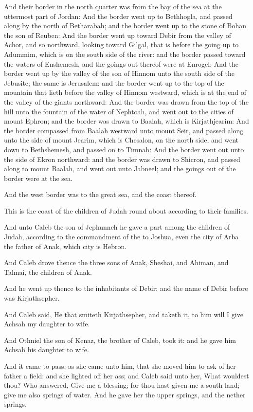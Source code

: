 And their border in the north quarter was from the bay of the sea at the uttermost part of Jordan: \verse And the border went up to Bethhogla, and passed along by the north of Betharabah; and the border went up to the stone of Bohan the son of Reuben: \verse And the border went up toward Debir from the valley of Achor, and so northward, looking toward Gilgal, that is before the going up to Adummim, which is on the south side of the river: and the border passed toward the waters of Enshemesh, and the goings out thereof were at Enrogel: \verse And the border went up by the valley of the son of Hinnom unto the south side of the Jebusite; the same is Jerusalem: and the border went up to the top of the mountain that lieth before the valley of Hinnom westward, which is at the end of the valley of the giants northward: \verse And the border was drawn from the top of the hill unto the fountain of the water of Nephtoah, and went out to the cities of mount Ephron; and the border was drawn to Baalah, which is Kirjathjearim: \verse And the border compassed from Baalah westward unto mount Seir, and passed along unto the side of mount Jearim, which is Chesalon, on the north side, and went down to Bethshemesh, and passed on to Timnah: \verse And the border went out unto the side of Ekron northward: and the border was drawn to Shicron, and passed along to mount Baalah, and went out unto Jabneel; and the goings out of the border were at the sea.

\verse And the west border was to the great sea, and the coast thereof.

This is the coast of the children of Judah round about according to their families.

\verse And unto Caleb the son of Jephunneh he gave a part among the children of Judah, according to the commandment of the \LORD to Joshua, even the city of Arba the father of Anak, which city is Hebron.

\verse And Caleb drove thence the three sons of Anak, Sheshai, and Ahiman, and Talmai, the children of Anak.

\verse And he went up thence to the inhabitants of Debir: and the name of Debir before was Kirjathsepher.

\verse And Caleb said, He that smiteth Kirjathsepher, and taketh it, to him will I give Achsah my daughter to wife.

\verse And Othniel the son of Kenaz, the brother of Caleb, took it: and he gave him Achsah his daughter to wife.

\verse And it came to pass, as she came unto him, that she moved him to ask of her father a field: and she lighted off her ass; and Caleb said unto her, What wouldest thou?  \verse Who answered, Give me a blessing; for thou hast given me a south land; give me also springs of water.  And he gave her the upper springs, and the nether springs.

